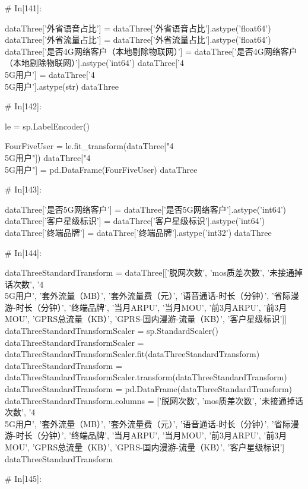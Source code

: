 \documentclass{MathorCupmodeling}
\begin{document}
\begin{python}
	# In[141]:
	
	
	dataThree['外省语音占比'] = dataThree['外省语音占比'].astype('float64')
	dataThree['外省流量占比'] = dataThree['外省流量占比'].astype('float64')
	dataThree['是否4G网络客户（本地剔除物联网）'] = dataThree['是否4G网络客户（本地剔除物联网）'].astype('int64')
	dataThree['4\\5G用户'] = dataThree['4\\5G用户'].astype(str)
	dataThree
	
	# In[142]:
	
	
	le = sp.LabelEncoder()
	
	FourFiveUser = le.fit_transform(dataThree["4\\5G用户"])
	dataThree["4\\5G用户"] = pd.DataFrame(FourFiveUser)
	dataThree
	
	# In[143]:
	
	
	dataThree['是否5G网络客户'] = dataThree['是否5G网络客户'].astype('int64')
	dataThree['客户星级标识'] = dataThree['客户星级标识'].astype('int64')
	dataThree['终端品牌'] = dataThree['终端品牌'].astype('int32')
	dataThree
	
	# In[144]:
	
	
	dataThreeStandardTransform = dataThree[['脱网次数', 'mos质差次数', '未接通掉话次数', '4\\5G用户', '套外流量（MB）', '套外流量费（元）', '语音通话-时长（分钟）', '省际漫游-时长（分钟）', '终端品牌', '当月ARPU', '当月MOU', '前3月ARPU', '前3月MOU', 'GPRS总流量（KB）', 'GPRS-国内漫游-流量（KB）', '客户星级标识']]
	dataThreeStandardTransformScaler = sp.StandardScaler()
	dataThreeStandardTransformScaler = dataThreeStandardTransformScaler.fit(dataThreeStandardTransform)
	dataThreeStandardTransform = dataThreeStandardTransformScaler.transform(dataThreeStandardTransform)
	dataThreeStandardTransform = pd.DataFrame(dataThreeStandardTransform)
	dataThreeStandardTransform.columns = ['脱网次数', 'mos质差次数', '未接通掉话次数', '4\\5G用户', '套外流量（MB）', '套外流量费（元）', '语音通话-时长（分钟）', '省际漫游-时长（分钟）', '终端品牌', '当月ARPU', '当月MOU', '前3月ARPU', '前3月MOU', 'GPRS总流量（KB）', 'GPRS-国内漫游-流量（KB）', '客户星级标识']
	dataThreeStandardTransform
	
	# In[145]:
	

\end{python}
\end{document}
